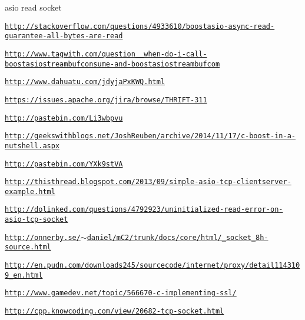 \par
asio read socket \par
\href{http://stackoverflow.com/questions/4933610/boostasio-async-read-guarantee-all-bytes-are-read}{\tt http\-://stackoverflow.\-com/questions/4933610/boostasio-\/async-\/read-\/guarantee-\/all-\/bytes-\/are-\/read} \par
\href{http://www.tagwith.com/question_285175_when-do-i-call-boostasiostreambufconsume-and-boostasiostreambufcom}{\tt http\-://www.\-tagwith.\-com/question\-\_\-\_\-when-\/do-\/i-\/call-\/boostasiostreambufconsume-\/and-\/boostasiostreambufcom} \par
\href{http://www.dahuatu.com/jdyjaPxKWQ.html}{\tt http\-://www.\-dahuatu.\-com/jdyja\-Px\-K\-W\-Q.\-html} \par
\href{https://issues.apache.org/jira/browse/THRIFT-311}{\tt https\-://issues.\-apache.\-org/jira/browse/\-T\-H\-R\-I\-F\-T-\/311} \par
\href{http://pastebin.com/Li3wbpvu}{\tt http\-://pastebin.\-com/\-Li3wbpvu} \par
\href{http://geekswithblogs.net/JoshReuben/archive/2014/11/17/c-boost-in-a-nutshell.aspx}{\tt http\-://geekswithblogs.\-net/\-Josh\-Reuben/archive/2014/11/17/c-\/boost-\/in-\/a-\/nutshell.\-aspx} \par
\href{http://pastebin.com/YXk9stVA}{\tt http\-://pastebin.\-com/\-Y\-Xk9st\-V\-A} \par
\href{http://thisthread.blogspot.com/2013/09/simple-asio-tcp-clientserver-example.html}{\tt http\-://thisthread.\-blogspot.\-com/2013/09/simple-\/asio-\/tcp-\/clientserver-\/example.\-html} \par
\href{http://dolinked.com/questions/4792923/uninitialized-read-error-on-asio-tcp-socket}{\tt http\-://dolinked.\-com/questions/4792923/uninitialized-\/read-\/error-\/on-\/asio-\/tcp-\/socket} \par
\href{http://onnerby.se/~daniel/mC2/trunk/docs/core/html/_socket_8h-source.html}{\tt http\-://onnerby.\-se/$\sim$daniel/m\-C2/trunk/docs/core/html/\-\_\-socket\-\_\-8h-\/source.\-html} \par
\href{http://en.pudn.com/downloads245/sourcecode/internet/proxy/detail1143109_en.html}{\tt http\-://en.\-pudn.\-com/downloads245/sourcecode/internet/proxy/detail1143109\-\_\-en.\-html} \par
\href{http://www.gamedev.net/topic/566670-c-implementing-ssl/}{\tt http\-://www.\-gamedev.\-net/topic/566670-\/c-\/implementing-\/ssl/} \par
\href{http://cpp.knowcoding.com/view/20682-tcp-socket.html}{\tt http\-://cpp.\-knowcoding.\-com/view/20682-\/tcp-\/socket.\-html} \par
